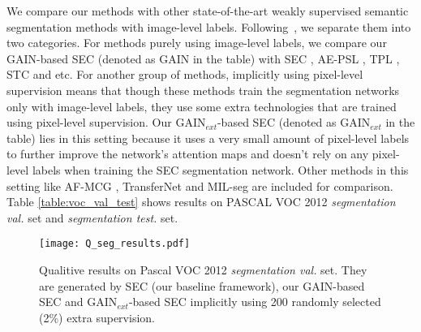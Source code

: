 \documentclass[10pt,twocolumn,letterpaper]{article}
\begin{document}
We compare our methods with other state-of-the-art weakly supervised semantic segmentation methods with image-level labels. Following~\cite{wei2017object}, we separate them into two categories. For methods purely using image-level labels, we compare our GAIN-based SEC (denoted as GAIN in the table) with SEC \cite{kolesnikov2016seed}, AE-PSL \cite{wei2017object}, TPL \cite{kim2017two}, STC \cite{wei2017stc} and etc. For another group of methods, implicitly using pixel-level supervision means that though these methods train the segmentation networks only with image-level labels, they use some extra technologies that are trained using pixel-level supervision. Our GAIN$_{ext}$-based SEC (denoted as GAIN$_{ext}$ in the table) lies in this setting because it uses a very small amount of pixel-level labels to further improve the network's attention maps and doesn't rely on any pixel-level labels when training the SEC segmentation network. Other methods in this setting like AF-MCG \cite{zhou2016learning}, TransferNet \cite{hong2016learning} and MIL-seg \cite{pinheiro2015image} are included for comparison. Table \ref{table:voc_val_test} shows results on PASCAL VOC 2012 \emph{segmentation val.} set and \emph{segmentation test.} set.












\begin{figure}%
\centering
\texttt{[image: Q\_seg\_results.pdf]} %
\caption{Qualitive results on Pascal VOC 2012 \emph{segmentation val.} set. They are generated by SEC (our baseline framework), our GAIN-based SEC and GAIN$_{ext}$-based SEC implicitly using 200 randomly selected (2\%) extra supervision.}
\label{fig:Q_seg}
\end{figure}
\end{document}
